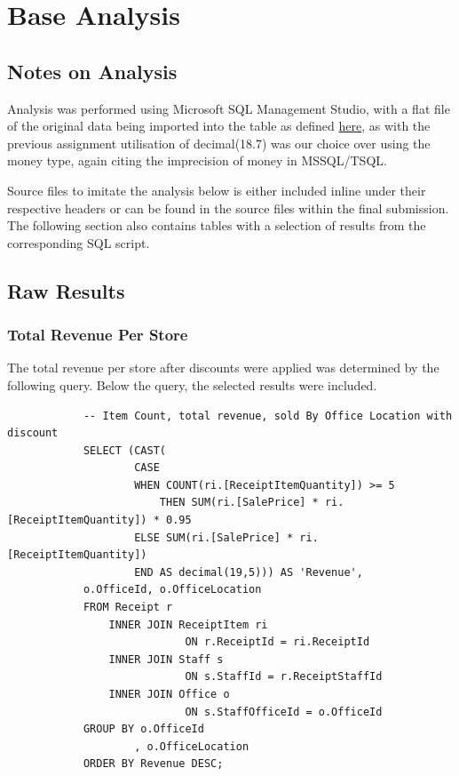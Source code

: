 \documentclass{article}
\begin{document}
\newpage

    \section{Base Analysis}
    \label{sec:BA}

        \subsection{Notes on Analysis}
            Analysis was performed using Microsoft SQL Management Studio,
            with a flat file of the original data being imported into 
            the table as defined \hyperref[sec:ETL]{\color{blue}here},
            as with the previous assignment utilisation of decimal(18.7) was our choice over using the money type, again citing the imprecision of money in MSSQL/TSQL\cite{MoneyIssues}.

            Source files to imitate the analysis below is either included inline under their respective headers or can be found in the source files within the final submission. The following section also contains tables with a selection of results from the corresponding SQL script. 

            \subsection{Raw Results}

            \subsubsection{Total Revenue Per Store}
            The total revenue per store after discounts were applied was determined by the following 
            query. Below the query, the selected results were included.
            
            \vspace{2mm}
            
            \begin{lstlisting}
            -- Item Count, total revenue, sold By Office Location with discount
            SELECT (CAST(
                    CASE
                    WHEN COUNT(ri.[ReceiptItemQuantity]) >= 5
                        THEN SUM(ri.[SalePrice] * ri.[ReceiptItemQuantity]) * 0.95
                    ELSE SUM(ri.[SalePrice] * ri.[ReceiptItemQuantity])
                    END AS decimal(19,5))) AS 'Revenue',
            o.OfficeId, o.OfficeLocation
            FROM Receipt r
                INNER JOIN ReceiptItem ri
                            ON r.ReceiptId = ri.ReceiptId
                INNER JOIN Staff s
                            ON s.StaffId = r.ReceiptStaffId
                INNER JOIN Office o
                            ON s.StaffOfficeId = o.OfficeId
            GROUP BY o.OfficeId
                    , o.OfficeLocation
            ORDER BY Revenue DESC;
            \end{lstlisting}
\end{document}
